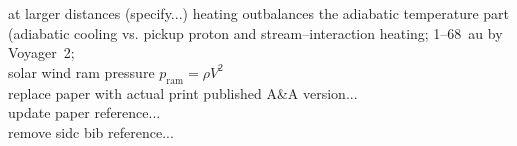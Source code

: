 at larger distances (specify...) heating outbalances the adiabatic temperature part (adiabatic cooling vs. pickup proton and stream--interaction heating; 1--68~au by Voyager~2; \citet{Richardson2003}\\
solar wind ram pressure $p_\text{ram} = \rho V^2$\\


replace paper with actual print published A\&A version...\\
update paper reference...\\
remove sidc bib reference...\\


\cleardoublepage
